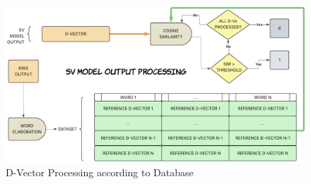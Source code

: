\begin{center}
    \centering
    \begin{figure}[!h]
        \includegraphics[width=1.0\textwidth]{images/4.04 D-Vector Processing.png}
        \caption{D-Vector Processing according to Database}
        \label{fig:dvector processing}
    \end{figure}
\end{center}
